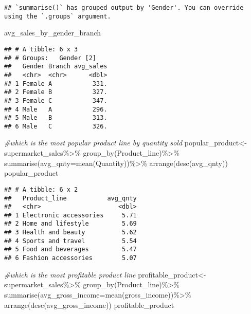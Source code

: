\documentclass[
]{article}
\newenvironment{Shaded}{\begin{snugshade}}{\end{snugshade}}
\newcommand{\AttributeTok}[1]{\textcolor[rgb]{0.77,0.63,0.00}{#1}}
\newcommand{\CommentTok}[1]{\textcolor[rgb]{0.56,0.35,0.01}{\textit{#1}}}
\newcommand{\FunctionTok}[1]{\textcolor[rgb]{0.00,0.00,0.00}{#1}}
\newcommand{\NormalTok}[1]{#1}
\newcommand{\OtherTok}[1]{\textcolor[rgb]{0.56,0.35,0.01}{#1}}
\newcommand{\SpecialCharTok}[1]{\textcolor[rgb]{0.00,0.00,0.00}{#1}}
\begin{document}
\begin{verbatim}
## `summarise()` has grouped output by 'Gender'. You can override using the `.groups` argument.
\end{verbatim}

\begin{Shaded}
\begin{Highlighting}[]
\NormalTok{avg\_sales\_by\_gender\_branch}
\end{Highlighting}
\end{Shaded}

\begin{verbatim}
## # A tibble: 6 x 3
## # Groups:   Gender [2]
##   Gender Branch avg_sales
##   <chr>  <chr>      <dbl>
## 1 Female A           331.
## 2 Female B           327.
## 3 Female C           347.
## 4 Male   A           296.
## 5 Male   B           313.
## 6 Male   C           326.
\end{verbatim}

\begin{Shaded}
\begin{Highlighting}[]
\CommentTok{\#which is the most popular product line by quantity sold}
\NormalTok{popular\_product}\OtherTok{\textless{}{-}}\NormalTok{supermarket\_sales}\SpecialCharTok{\%\textgreater{}\%}
  \FunctionTok{group\_by}\NormalTok{(Product\_line)}\SpecialCharTok{\%\textgreater{}\%}
  \FunctionTok{summarise}\NormalTok{(}\AttributeTok{avg\_qnty=}\FunctionTok{mean}\NormalTok{(Quantity))}\SpecialCharTok{\%\textgreater{}\%}
  \FunctionTok{arrange}\NormalTok{(}\FunctionTok{desc}\NormalTok{(avg\_qnty))}
\NormalTok{popular\_product}
\end{Highlighting}
\end{Shaded}

\begin{verbatim}
## # A tibble: 6 x 2
##   Product_line           avg_qnty
##   <chr>                     <dbl>
## 1 Electronic accessories     5.71
## 2 Home and lifestyle         5.69
## 3 Health and beauty          5.62
## 4 Sports and travel          5.54
## 5 Food and beverages         5.47
## 6 Fashion accessories        5.07
\end{verbatim}

\begin{Shaded}
\begin{Highlighting}[]
\CommentTok{\#which is the most profitable product line}
\NormalTok{profitable\_product}\OtherTok{\textless{}{-}}\NormalTok{supermarket\_sales}\SpecialCharTok{\%\textgreater{}\%}
  \FunctionTok{group\_by}\NormalTok{(Product\_line)}\SpecialCharTok{\%\textgreater{}\%}
  \FunctionTok{summarise}\NormalTok{(}\AttributeTok{avg\_gross\_income=}\FunctionTok{mean}\NormalTok{(gross\_income))}\SpecialCharTok{\%\textgreater{}\%}
  \FunctionTok{arrange}\NormalTok{(}\FunctionTok{desc}\NormalTok{(avg\_gross\_income))}
\NormalTok{profitable\_product}
\end{Highlighting}
\end{Shaded}
\end{document}
